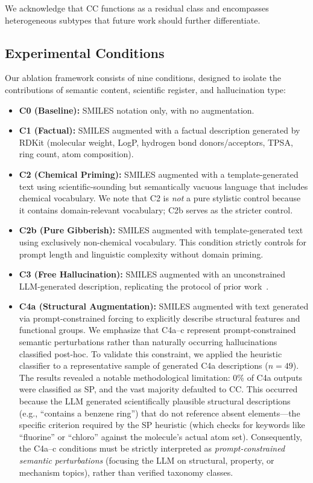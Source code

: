 We acknowledge that CC functions as a residual class and encompasses heterogeneous subtypes that future work should further differentiate.

\subsection{Experimental Conditions}
Our ablation framework consists of nine conditions, designed to isolate the contributions of semantic content, scientific register, and hallucination type:

\begin{itemize}
    \item \textbf{C0 (Baseline):} SMILES notation only, with no augmentation.
    \item \textbf{C1 (Factual):} SMILES augmented with a factual description generated by RDKit (molecular weight, LogP, hydrogen bond donors/acceptors, TPSA, ring count, atom composition).
    \item \textbf{C2 (Chemical Priming):} SMILES augmented with a template-generated text using scientific-sounding but semantically vacuous language that includes chemical vocabulary. We note that C2 is \emph{not} a pure stylistic control because it contains domain-relevant vocabulary; C2b serves as the stricter control.
    \item \textbf{C2b (Pure Gibberish):} SMILES augmented with template-generated text using exclusively non-chemical vocabulary. This condition strictly controls for prompt length and linguistic complexity without domain priming.
    \item \textbf{C3 (Free Hallucination):} SMILES augmented with an unconstrained LLM-generated description, replicating the protocol of prior work~\cite{chen2023llm4mol}.
    \item \textbf{C4a (Structural Augmentation):} SMILES augmented with text generated via prompt-constrained forcing to explicitly describe structural features and functional groups. We emphasize that C4a--c represent prompt-constrained semantic perturbations rather than naturally occurring hallucinations classified post-hoc. To validate this constraint, we applied the heuristic classifier to a representative sample of generated C4a descriptions ($n=49$). The results revealed a notable methodological limitation: 0\% of C4a outputs were classified as SP, and the vast majority defaulted to CC. This occurred because the LLM generated scientifically plausible structural descriptions (e.g., ``contains a benzene ring'') that do not reference absent elements---the specific criterion required by the SP heuristic (which checks for keywords like ``fluorine'' or ``chloro'' against the molecule's actual atom set). Consequently, the C4a--c conditions must be strictly interpreted as \textit{prompt-constrained semantic perturbations} (focusing the LLM on structural, property, or mechanism topics), rather than verified taxonomy classes.

\end{itemize}

